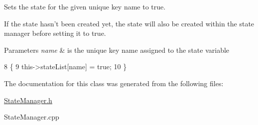 Sets the state for the given unique key name to true. 

If the state hasn't been created yet, the state will also be created within the state manager before setting it to true.


\begin{DoxyParams}{Parameters}
{\em name} & is the unique key name assigned to the state variable \\
\hline
\end{DoxyParams}

\begin{DoxyCode}
8                                                   \{
9     this->stateList[name] = \textcolor{keyword}{true};
10 \}
\end{DoxyCode}


The documentation for this class was generated from the following files\-:\begin{DoxyCompactItemize}
\item 
\hyperlink{_state_manager_8h}{State\-Manager.\-h}\item 
State\-Manager.\-cpp\end{DoxyCompactItemize}
